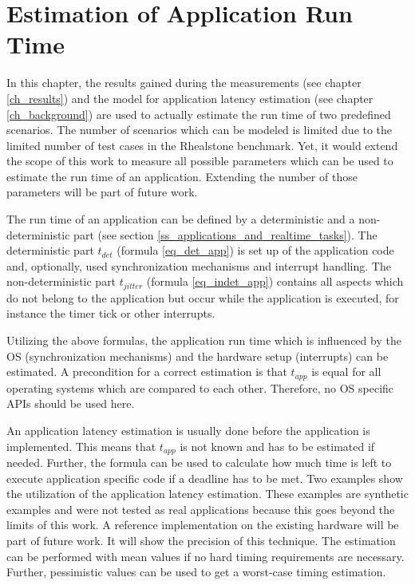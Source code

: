 \chapter{Estimation of Application Run Time}\label{ch_estimation_of_application_run_time}
In this chapter, the results gained during the measurements (see chapter \ref{ch_results}) and the model for application latency estimation (see chapter \ref{ch_background}) are used to actually estimate the run time of two predefined scenarios.
The number of scenarios which can be modeled is limited due to the limited number of test cases in the Rhealstone benchmark.
Yet, it would extend the scope of this work to measure all possible parameters which can be used to estimate the run time of an application.
Extending the number of those parameters will be part of future work.
\par
The run time of an application can be defined by a deterministic and a non-deterministic part (see section \ref{ss_applications_and_realtime_tasks}). 
The deterministic part $t_{det}$ (formula \ref{eq_det_app}) is set up of the application code and, optionally, used synchronization mechanisms and interrupt handling.
The non-deterministic part $t_{jitter}$ (formula \ref{eq_indet_app}) contains all aspects which do not belong to the application but occur while the application is executed, for instance the timer tick or other interrupts.  
\par
Utilizing the above formulas, the application run time which is influenced by the \ac{OS} (synchronization mechanisms) and the hardware setup (interrupts) can be estimated. 
A precondition for a correct estimation is that $t_{app}$ is equal for all operating systems which are compared to each other. 
Therefore, no \ac{OS} specific \acp{API} should be used here.
\par
An application latency estimation is usually done before the application is implemented. 
This means that $t_{app}$ is not known and has to be estimated if needed. 
Further, the formula can be used to calculate how much time is left to execute application specific code if a deadline has to be met. 
Two examples show the utilization of the application latency estimation.
These examples are synthetic examples and were not tested as real applications because this goes beyond the limits of this work.
A reference implementation on the existing hardware will be part of future work.
It will show the precision of this technique.
The estimation can be performed with mean values if no hard timing requirements are necessary. 
Further, pessimistic values can be used to get a worst-case timing estimation.

